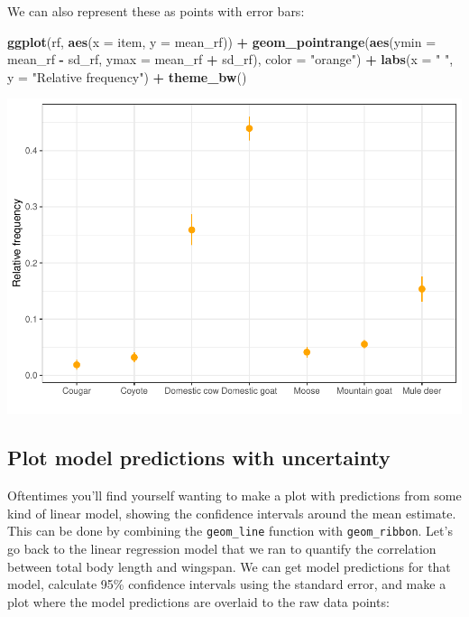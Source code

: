 \documentclass[
]{book}
\newenvironment{Shaded}{\begin{snugshade}}{\end{snugshade}}
\newcommand{\AttributeTok}[1]{\textcolor[rgb]{0.13,0.29,0.53}{#1}}
\newcommand{\FunctionTok}[1]{\textcolor[rgb]{0.13,0.29,0.53}{\textbf{#1}}}
\newcommand{\NormalTok}[1]{#1}
\newcommand{\SpecialCharTok}[1]{\textcolor[rgb]{0.81,0.36,0.00}{\textbf{#1}}}
\newcommand{\StringTok}[1]{\textcolor[rgb]{0.31,0.60,0.02}{#1}}
\begin{document}
We can also represent these as points with error bars:

\begin{Shaded}
\begin{Highlighting}[]
\FunctionTok{ggplot}\NormalTok{(rf, }\FunctionTok{aes}\NormalTok{(}\AttributeTok{x =}\NormalTok{ item, }\AttributeTok{y =}\NormalTok{ mean\_rf)) }\SpecialCharTok{+}
  \FunctionTok{geom\_pointrange}\NormalTok{(}\FunctionTok{aes}\NormalTok{(}\AttributeTok{ymin =}\NormalTok{ mean\_rf }\SpecialCharTok{{-}}\NormalTok{ sd\_rf,}
                    \AttributeTok{ymax =}\NormalTok{ mean\_rf }\SpecialCharTok{+}\NormalTok{ sd\_rf),}
                \AttributeTok{color =} \StringTok{"orange"}\NormalTok{) }\SpecialCharTok{+}
  \FunctionTok{labs}\NormalTok{(}\AttributeTok{x =} \StringTok{" "}\NormalTok{, }\AttributeTok{y =} \StringTok{"Relative frequency"}\NormalTok{) }\SpecialCharTok{+}
  \FunctionTok{theme\_bw}\NormalTok{()}
\end{Highlighting}
\end{Shaded}

\includegraphics{reproducible-science_files/figure-latex/gg29-1.pdf}

\hypertarget{plot-model-predictions-with-uncertainty}{%
\subsection{Plot model predictions with uncertainty}\label{plot-model-predictions-with-uncertainty}}

Oftentimes you'll find yourself wanting to make a plot with predictions from
some kind of linear model, showing the confidence intervals around the mean
estimate. This can be done by combining the \texttt{geom\_line} function with \texttt{geom\_ribbon}.
Let's go back to the linear regression model that we ran to quantify the
correlation between total body length and wingspan. We can get model predictions
for that model, calculate 95\% confidence intervals using the standard error,
and make a plot where the model predictions are overlaid to the raw data points:
\end{document}

